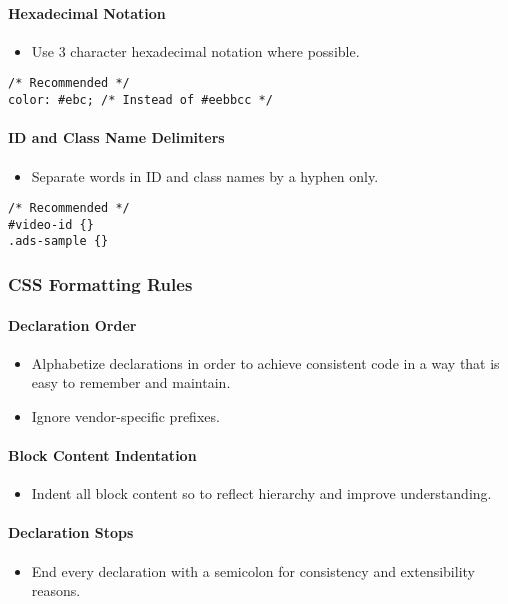 \documentclass[a4paper, 11pt]{article}
\begin{document}
\paragraph{Hexadecimal Notation}
\begin{itemize}
\item Use 3 character hexadecimal notation where possible.
\end{itemize}
\begin{verbatim}
/* Recommended */
color: #ebc; /* Instead of #eebbcc */
\end{verbatim}

\paragraph{ID and Class Name Delimiters}
\begin{itemize}
\item Separate words in ID and class names by a hyphen only.
\end{itemize}
\begin{verbatim}
/* Recommended */
#video-id {}
.ads-sample {}
\end{verbatim}

\subsubsection{CSS Formatting Rules}

\paragraph{Declaration Order}
\begin{itemize}
\item Alphabetize declarations in order to achieve consistent code in a way that is easy to remember and maintain.
\item Ignore vendor-specific prefixes.
\end{itemize}

\paragraph{Block Content Indentation}
\begin{itemize}
\item Indent all block content so to reflect hierarchy and improve understanding.
\end{itemize}

\paragraph{Declaration Stops}
\begin{itemize}
\item End every declaration with a semicolon for consistency and extensibility reasons.
\end{itemize}
\end{document}

